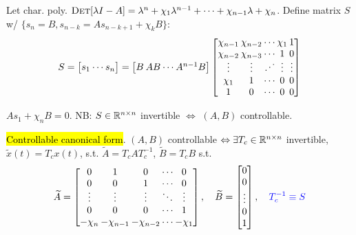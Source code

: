 \begin{Definition}
Let char. poly. $\textsc{Det}[\lambda I-A]=\lambda^n+\chi_1\lambda^{n-1}+\cdots+\chi_{n-1}\lambda+\chi_n$. Define matrix $S$ w/ $\{s_n=B,s_{n-k}=As_{n-k+1}+\chi_kB\}$:
\begin{equation*}
\def\arraycolsep{1pt}
S=\begin{bmatrix}
s_1 & \cdots & s_n
\end{bmatrix}=\begin{bmatrix}
B & AB & \cdots & A^{n-1}B
\end{bmatrix}\begin{bmatrix}
\chi_{n-1} & \chi_{n-2} & \cdots & \chi_1 & 1 \\
\chi_{n-2} & \chi_{n-3} & \cdots & 1 & 0 \vspace{-1mm} \\
\vdots & \vdots & \iddots & \vdots & \vdots \\
\chi_1 & 1 & \cdots & 0 & 0 \\
1 & 0 & \cdots & 0 & 0
\end{bmatrix}
\end{equation*}
\begin{Theorem}
$As_1+\chi_nB=0$. NB: $S\in\mathbb R^{n\times n}$ invertible $\Leftrightarrow$ $(A,B)$ controllable.
\end{Theorem}
\end{Definition}
\begin{Theorem}
\hl{Controllable canonical form}. $(A,B)$ controllable $\Leftrightarrow\exists T_c\in\mathbb R^{n\times n}$ invertible, $\widetilde x(t)=T_cx(t)$, s.t. $\widetilde A=T_cAT_c^{-1}$, $\widetilde B=T_cB$ s.t.
\begin{equation*}
\def\arraycolsep{1pt}
\widetilde A=
\begin{bmatrix}
0 & 1 & 0 & \cdots & 0 \\
0 & 0 & 1 & \cdots & 0\vspace{-1mm} \\
\vdots & \vdots & \vdots & \ddots & \vdots \\
0 & 0 & 0 & \cdots & 1 \\
-\chi_n & -\chi_{n-1} & -\chi_{n-2} & \cdots & -\chi_1
\end{bmatrix},\quad\widetilde B=\begin{bmatrix}
0 \\ 0 \\ \vdots \\ 0 \\ 1
\end{bmatrix},\quad\mc{blue}{T_c^{-1}\equiv S}
\end{equation*}
\end{Theorem}
